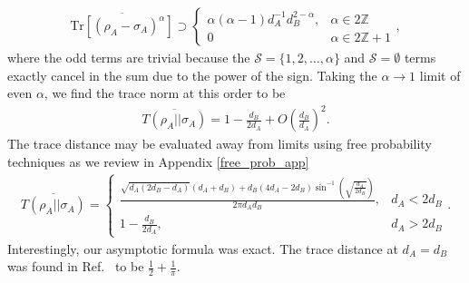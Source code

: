 \documentclass[a4paper,11pt]{article}
\newcommand{\Tr}{\text{Tr}}
\begin{document}
\begin{align}
    \overline{\Tr\left[ (\rho_A- \sigma_A)^{\alpha}\right]} \supset  \begin{cases}
       \alpha(\alpha -1 ) d_A^{-1}d_B^{2-{\alpha}}, & \alpha \in 2\mathbb{Z}
       \\
       0 & \alpha \in 2\mathbb{Z} + 1
    \end{cases},
\end{align}
where the odd terms are trivial because the  $\mathcal{S} = \{ 1,2,\dots, \alpha\}$ and $\mathcal{S} = \emptyset$ terms exactly cancel in the sum due to the power of the sign.
Taking the $\alpha \rightarrow 1$ limit of even $\alpha$, we find the trace norm at this order to be
\begin{align}
    \overline{T(\rho_A || \sigma_A)} = 1 -\frac{d_B}{2d_A}+  O\left( \frac{d_B}{d_A}\right)^2.
    \label{trace_distance_largedA}
\end{align}
The trace distance may be evaluated away from limits using free probability techniques as we review in Appendix \ref{free_prob_app} \cite{2015arXiv151107278M}
\begin{align}
    \overline{T(\rho_A || \sigma_A)} = \begin{cases}
        \frac{\sqrt{{d_A (2d_B-d_A)}}
   (d_A+d_B)+d_B(4d_A-2d_B) \sin
   ^{-1}\left(\sqrt{\frac{{d_A}}{{2d_B}}}\right)}{2 \pi 
  d_A d_B}, & d_A < 2d_B
   \\
   1 -\frac{d_B}{2d_A}, & d_A > 2d_B
    \end{cases}.
    \label{tracedistance_exact}
\end{align}
Interestingly, our asymptotic formula was exact. The trace distance at $d_A = d_B$ was found in Ref.~\cite{2016PhRvA..93f2112P} to be $\frac{1}{2}+\frac{1}{\pi}$.

\end{document}
